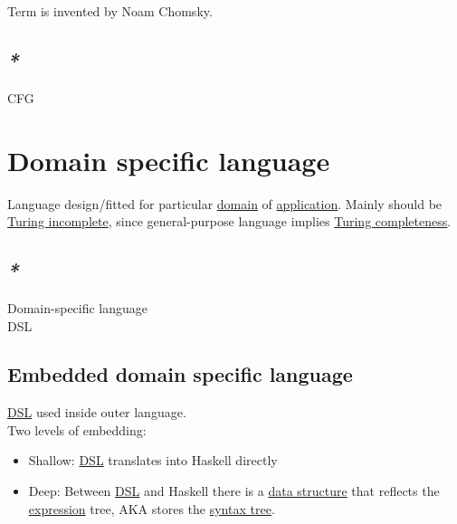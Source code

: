 \documentclass[a4paper,14pt,oneside]{book}
\begin{document}
Term is invented by Noam Chomsky.\\

\section{\emph{*}}
\label{sec:orgf55841b}

\label{org7d74a84}CFG\\

\chapter{\label{orga48b750}Domain specific language}
\label{sec:orgc493436}
Language design/fitted for particular \hyperref[orgeb6ec49]{domain} of \hyperref[org5c027e8]{application}. Mainly should be \hyperref[orgbe42227]{Turing incomplete}, since general-purpose language implies \hyperref[org761e970]{Turing completeness}.\\

\section{\emph{*}}
\label{sec:orgb36ef2c}

\label{orgadc5ba4}Domain-specific language\\
\label{org581a930}DSL\\

\section{\label{org1f61f38}Embedded domain specific language}
\label{sec:org25d4df0}

\hyperref[org581a930]{DSL} used inside outer language.\\

Two levels of embedding:\\

\begin{itemize}
\item Shallow: \hyperref[org581a930]{DSL} translates into Haskell directly\\
\item Deep: Between \hyperref[org581a930]{DSL} and Haskell there is a \hyperref[org6c75d51]{data structure} that reflects the \hyperref[org6aa6989]{expression} tree, AKA stores the \hyperref[org1e5eb45]{syntax tree}.\\
\end{itemize}
\end{document}
